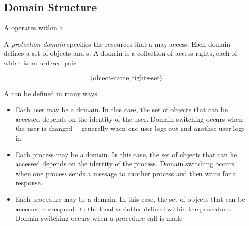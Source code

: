\subsection{Domain Structure}\label{subsubsec:Domain_Structure}
A  operates within a .

\begin{definition}\label{def:Protection_Domain}
  A \emph{protection domain} specifies the resources that a  may access.
  Each domain defines a set of objects and s.
  A domain is a collection of access rights, each of which is an ordered pair

  \begin{equation}\label{eq:Protection_Domain}
    \langle \text{object-name}, \text{rights-set} \rangle
  \end{equation}
\end{definition}

A  can be defined in many ways.
\begin{itemize}[noitemsep]
\item Each user may be a domain. In this case, the set of objects that
  can be accessed depends on the identity of the user. Domain
  switching occurs when the user is changed —generally when one user
  logs out and another user logs in.
\item Each process may be a domain.
  In this case, the set of objects that can be accessed depends on the
  identity of the process. Domain switching occurs when one process
  sends a message to another process and then waits for a response.
\item Each procedure may be a domain. In this case, the set of objects
  that can be accessed corresponds to the local variables defined
  within the procedure. Domain switching occurs when a procedure call
  is made.
\end{itemize}

